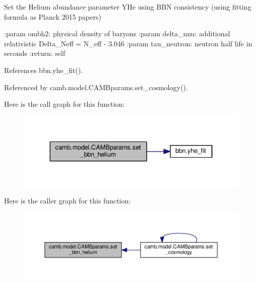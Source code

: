 \begin{DoxyVerb}Set the Helium abundance parameter YHe using BBN consistency (using fitting formula as Planck 2015 papers)

:param ombh2: physical density of baryons
:param delta_nnu: additional relativistic Delta_Neff = N_eff - 3.046
:param tau_neutron: neutron half life in seconds
:return: self
\end{DoxyVerb}
 

References bbn.\+yhe\+\_\+fit().



Referenced by camb.\+model.\+C\+A\+M\+Bparams.\+set\+\_\+cosmology().

Here is the call graph for this function\+:
\nopagebreak
\begin{figure}[H]
\begin{center}
\leavevmode
\includegraphics[width=334pt]{classcamb_1_1model_1_1CAMBparams_a4dba2e237590bea1b9363d9aa0665c03_cgraph}
\end{center}
\end{figure}
Here is the caller graph for this function\+:
\nopagebreak
\begin{figure}[H]
\begin{center}
\leavevmode
\includegraphics[width=350pt]{classcamb_1_1model_1_1CAMBparams_a4dba2e237590bea1b9363d9aa0665c03_icgraph}
\end{center}
\end{figure}
\mbox{\label{classcamb_1_1model_1_1CAMBparams_a2cc8871c90745590e02d61f2c731100c}} 
